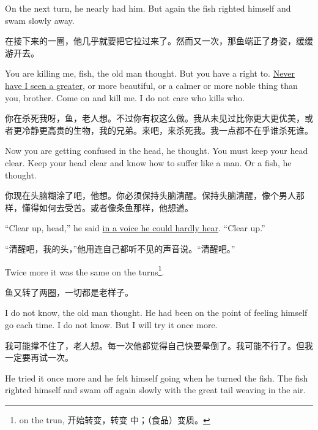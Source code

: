 \begin{paracol}{2}
\switchcolumn*

On the next turn, he nearly had him. But again the fish righted himself and
swam slowly away.

\switchcolumn

在接下来的一圈，他几乎就要把它拉过来了。然而又一次，那鱼端正了身姿，缓缓游开去。

\switchcolumn*

You are killing me, fish, the old man thought. But you have a right to.
\uline{Never have I seen a greater}, or more beautiful, or a calmer or more noble
thing than you, brother. Come on and kill me. I do not care who kills who.

\switchcolumn

你在杀死我呀，鱼，老人想。不过你有权这么做。我从未见过比你更大更优美，或者更冷静更高贵的生物，我的兄弟。来吧，来杀死我。我一点都不在乎谁杀死谁。

\switchcolumn*

Now you are getting \gls{confused} in the head, he thought. You must keep your
head clear. Keep your head clear and know how to \gls{suffer} like a man. Or a
fish, he thought.

\switchcolumn

你现在头脑糊涂了吧，他想。你必须保持头脑清醒。保持头脑清醒，像个男人那样，懂得如何去受苦。或者像条鱼那样，他想道。

\switchcolumn*

``Clear up, head,'' he said \uline{in a voice he could hardly hear}. ``Clear up.''

\switchcolumn

“清醒吧，我的头，”他用连自己都听不见的声音说。“清醒吧。”

\switchcolumn*

Twice more it was the same on the turns\footnote{on the trun, 开始转变，转变
  中；（食品）变质。}.

\switchcolumn

鱼又转了两圈，一切都是老样子。

\switchcolumn*

I do not know, the old man thought. He had been on the point of feeling
himself go each time. I do not know. But I will try it once more.

\switchcolumn

我可能撑不住了，老人想。每一次他都觉得自己快要晕倒了。我可能不行了。但我一定要再试一次。

\switchcolumn*

He tried it once more and he felt himself going when he turned the fish. The
fish righted himself and swam off again slowly with the great tail weaving
in the air.


\end{paracol}
